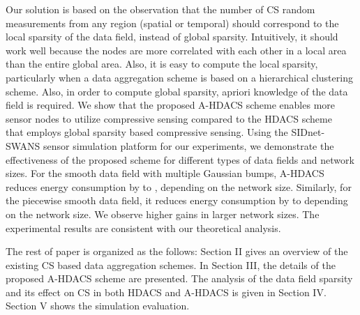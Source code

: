 \documentclass[conference]{IEEEtran}
\begin{document}
Our solution is based on the observation that the number of CS random measurements 
from any region (spatial or temporal) should correspond to the 
local sparsity of the data field, instead of global sparsity. 
Intuitively, it should work well because the nodes are 
more correlated with each other in a local area than the entire global area.  
Also,  it is easy to compute the local sparsity, particularly when a data aggregation scheme is 
based on a hierarchical clustering scheme.  Also, in order to compute global sparsity, 
apriori knowledge of the data field is required.  
We show that the proposed A-HDACS scheme 
enables more sensor nodes to utilize compressive sensing compared to the HDACS 
scheme~\cite{HDACS}
that employs global sparsity based compressive sensing. Using the SIDnet-SWANS \cite{SIDnet} 
sensor simulation platform for our experiments, we demonstrate 
the effectiveness of the proposed scheme 
for different types of data fields and network sizes. 
For the smooth data field with multiple Gaussian bumps, A-HDACS 
reduces energy consumption by  to , depending on the network size. Similarly, 
for the piecewise smooth data 
field, it reduces energy consumption by  to  depending on the network size.
We observe higher gains in larger network sizes. 
The experimental results are consistent with our theoretical analysis. 

The rest of paper is organized as the follows: Section II gives an overview of the existing 
CS based data aggregation schemes. In Section III, the details of the proposed A-HDACS scheme 
are presented. The analysis of the data field sparsity and its effect on CS in both HDACS and 
A-HDACS is given in Section IV. Section V shows the simulation evaluation. 
\end{document}
